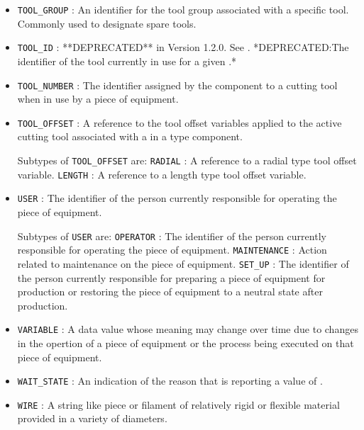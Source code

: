 \begin{itemize}
\item \texttt{TOOL_GROUP} : An identifier for the tool group associated with a specific tool. Commonly used to designate spare tools. 

\item \texttt{TOOL_ID} : **DEPRECATED** in Version 1.2.0.   See . *DEPRECATED:The identifier of the tool currently in use for a given .* 

\item \texttt{TOOL_NUMBER} : The identifier assigned by the  component to a cutting tool when in use by a piece of equipment. 

\item \texttt{TOOL_OFFSET} : A reference to the tool offset variables applied to the active cutting tool associated with a  in a  type component. 

Subtypes of \texttt{TOOL_OFFSET} are: 
\newline\tab \texttt{RADIAL} : A reference to a radial type tool offset variable. 
\newline\tab \texttt{LENGTH} : A reference to a length type tool offset variable. 
\item \texttt{USER} : The identifier of the person currently responsible for operating the piece of equipment. 

Subtypes of \texttt{USER} are: 
\newline\tab \texttt{OPERATOR} : The identifier of the person currently responsible for operating the piece of equipment. 
\newline\tab \texttt{MAINTENANCE} : Action related to maintenance on the piece of equipment. 
\newline\tab \texttt{SET_UP} : The identifier of the person currently responsible for preparing a piece of equipment for production or restoring the piece of equipment to a neutral state after production. 
\item \texttt{VARIABLE} : A data value whose meaning may change over time due to changes in the opertion of a piece of equipment or the process being executed on that piece of equipment. 

\item \texttt{WAIT_STATE} : An indication of the reason that  is reporting a value of . 

\item \texttt{WIRE} : A string like piece or filament of relatively rigid or flexible material provided in a variety of diameters. 


\end{itemize}
